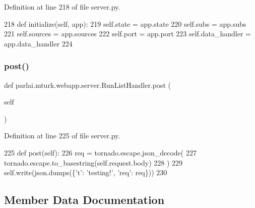 Definition at line 218 of file server.\+py.


\begin{DoxyCode}
218     \textcolor{keyword}{def }initialize(self, app):
219         self.state = app.state
220         self.subs = app.subs
221         self.sources = app.sources
222         self.port = app.port
223         self.data\_handler = app.data\_handler
224 
\end{DoxyCode}
\mbox{\label{classparlai_1_1mturk_1_1webapp_1_1server_1_1RunListHandler_a7ecee21fd9a47687af7466e502bba574}} 
\subsubsection{\texorpdfstring{post()}{post()}}
{\footnotesize\ttfamily def parlai.\+mturk.\+webapp.\+server.\+Run\+List\+Handler.\+post (\begin{DoxyParamCaption}\item[{}]{self }\end{DoxyParamCaption})}



Definition at line 225 of file server.\+py.


\begin{DoxyCode}
225     \textcolor{keyword}{def }post(self):
226         req = tornado.escape.json\_decode(
227             tornado.escape.to\_basestring(self.request.body)
228         )
229         self.write(json.dumps(\{\textcolor{stringliteral}{'t'}: \textcolor{stringliteral}{'testing!'}, \textcolor{stringliteral}{'req'}: req\}))
230 
\end{DoxyCode}


\subsection{Member Data Documentation}
\mbox{\label{classparlai_1_1mturk_1_1webapp_1_1server_1_1RunListHandler_a5084daae3aa6f6de486452498adbc2a1}} 

